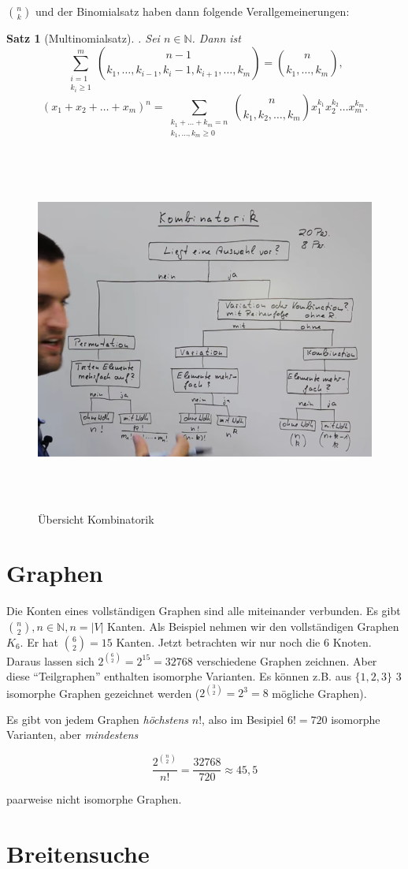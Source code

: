 \documentclass[12pt, twoside]{article}
\newcommand{\N}{\mathbb{N}}
\newtheorem{Sa}{Satz}[subsection]
\begin{document}
$\binom{n}{k}$ und der Binomialsatz haben dann folgende Verallgemeinerungen:


\begin{Sa}[Multinomialsatz]. Sei $n \in \N$. Dann ist
$$
\sum_{\substack{i=1 \\ k_i\ge1}}^{m}\binom{n-1}{k_1, \dots, k_{i-1}, k_i-1, k_{i+1}, \dots, k_m} = \binom{n}{k_1, \dots, k_m}, 
$$
$$
(x_1+x_2+ \ldots +x_m)^n = \sum_{\substack{k_1+\ldots+k_m=n \\ k_1, \dots, k_m\ge0}} \binom{n}{k_1, k_2, \dots, k_m}x_1^{k_1} x_2^{k_2} \ldots x_m^{k_m} .
$$
\end{Sa}



\begin{figure}
	\centering
	\includegraphics[height=12cm]{bld1.png}
	\caption{Übersicht Kombinatorik}
	\label{img:grafik-dummy}
\end{figure}

\section{Graphen}
Die Konten eines vollständigen Graphen sind alle miteinander verbunden. Es gibt $\binom{n}{2}, n \in \N, n = |V|$ Kanten.
Als Beispiel nehmen wir den vollständigen Graphen $K_6$. Er hat $\binom{6}{2} = 15$ Kanten. Jetzt betrachten wir nur noch
die 6 Knoten. Daraus lassen sich $2^{\binom{6}{2}} = 2^{15} = 32768$ verschiedene Graphen zeichnen. Aber diese "`Teilgraphen"'
enthalten isomorphe Varianten. Es können z.B. aus $\{1, 2, 3\}$ 3 isomorphe Graphen gezeichnet werden ($2^{\binom{3}{2}} = 2^{3} = 8$
 mögliche Graphen). 

Es gibt von jedem Graphen \textit{höchstens} $n!$, also im Besipiel $6! = 720$ isomorphe Varianten, aber \textit{mindestens} 

$$
\frac{2^{\binom{n}{2}}}{n!} = \frac{32768}{720} \approx 45,5
$$ 

paarweise nicht isomorphe Graphen.


\section{Breitensuche}
\end{document}
